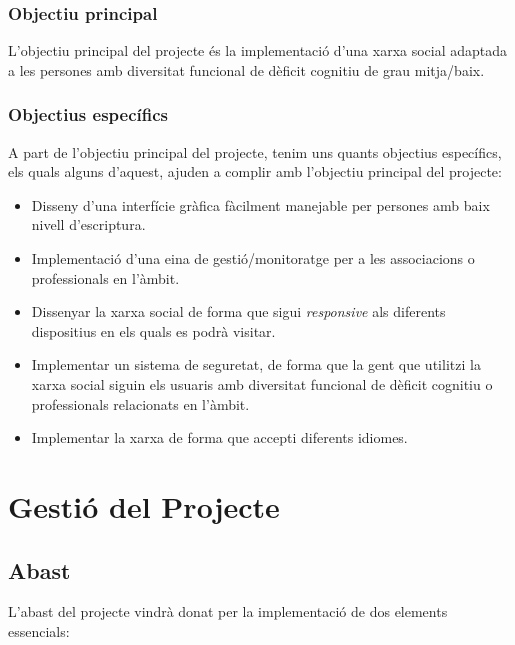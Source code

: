 \documentclass[11pt,catalan,listoffigures,listoftables]{tfgetsinf}
\begin{document}
\subsection{Objectiu principal}

L’objectiu principal del projecte és la implementació d’una xarxa social adaptada a les persones amb diversitat funcional de dèficit cognitiu de grau mitja/baix.

\subsection{Objectius específics}

A part de l’objectiu principal del projecte, tenim uns quants objectius específics, els quals alguns d’aquest, ajuden a complir amb l’objectiu principal del projecte:

\begin{itemize}
	\item Disseny d’una interfície gràfica fàcilment manejable per persones amb baix nivell d’escriptura.
	\item Implementació d’una eina de gestió/monitoratge per a les associacions o professionals en l’àmbit.
	\item Dissenyar la xarxa social de forma que sigui \textit{responsive} als diferents dispositius en els quals es podrà visitar.
	\item Implementar un sistema de seguretat, de forma que la gent que utilitzi la xarxa social siguin els usuaris amb diversitat funcional de dèficit cognitiu o professionals relacionats en l’àmbit.
	\item Implementar la xarxa de forma que accepti diferents idiomes.
\end{itemize}

\chapter{Gestió del Projecte}

\section{Abast}

L’abast del projecte vindrà donat per la implementació de dos elements essencials:
\end{document}
